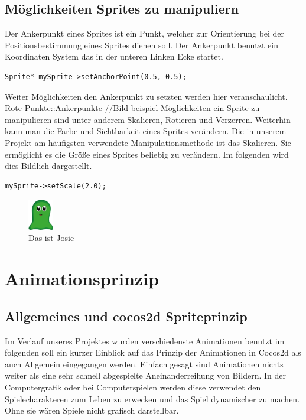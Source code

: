 \subsection{Möglichkeiten Sprites zu manipuliern}
Der Ankerpunkt eines Sprites ist ein Punkt, welcher zur Orientierung bei der Positionsbestimmung eines Sprites dienen soll. Der Ankerpunkt benutzt ein Koordinaten System das in der unteren Linken Ecke startet. 

\begin{lstlisting}[style=singleline]
Sprite* mySprite->setAnchorPoint(0.5, 0.5);
\end{lstlisting}


Weiter Möglichkeiten den Ankerpunkt zu setzten werden hier veranschaulicht. Rote Punkte::Ankerpunkte
//Bild beispiel
Möglichkeiten ein Sprite zu manipulieren sind unter anderem Skalieren, Rotieren und Verzerren. Weiterhin kann man die Farbe und Sichtbarkeit eines Sprites verändern. Die in unserem Projekt am häufigsten verwendete Manipulationsmethode ist das Skalieren. Sie ermöglicht es die Größe eines Sprites beliebig zu verändern. Im folgenden wird dies Bildlich dargestellt. 

\begin{lstlisting}[style=singleline]
mySprite->setScale(2.0);
\end{lstlisting}



\begin{figure}[h]
  \includegraphics[width=0.1\textwidth]{resources/josie}
  \caption{Das ist Josie}
  \label{fig:josie} 
\end{figure}



\section{Animationsprinzip}\label{sec:2_Animationsprinzip}



\subsection{Allgemeines und cocos2d Spriteprinzip}
Im Verlauf unseres Projektes wurden verschiedenste Animationen benutzt im folgenden soll ein kurzer Einblick auf das Prinzip der Animationen in Cocos2d als auch Allgemein  eingegangen werden. Einfach gesagt sind Animationen nichts weiter als eine sehr schnell abgespielte Aneinanderreihung von Bildern. In der Computergrafik oder bei Computerspielen werden diese verwendet den Spielecharakteren zum Leben zu erwecken und das Spiel dynamischer zu machen. Ohne sie wären Spiele nicht grafisch darstellbar.

